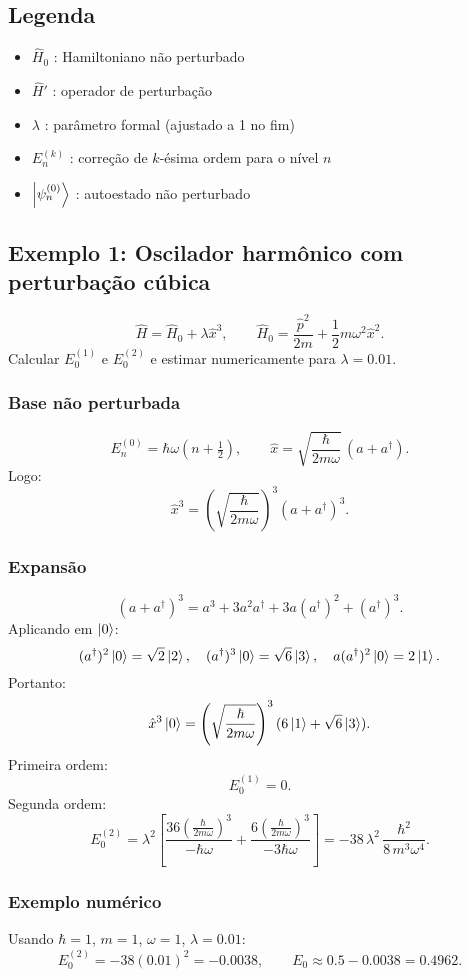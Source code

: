 \documentclass[12pt]{article}
\begin{document}
\subsection{Legenda}
\begin{itemize}
  \item $\hat H_0$ : Hamiltoniano não perturbado
  \item $\hat H'$ : operador de perturbação
  \item $\lambda$ : parâmetro formal (ajustado a 1 no fim)
  \item $E_n^{(k)}$ : correção de $k$-ésima ordem para o nível $n$
  \item $\ket{\psi_n^{(0)}}$ : autoestado não perturbado
\end{itemize}

\subsection{Exemplo 1: Oscilador harmônico com perturbação cúbica}

\[
\hat H = \hat H_0 + \lambda \hat x^3,\qquad
\hat H_0=\frac{\hat p^2}{2m}+\frac{1}{2}m\omega^2\hat x^2.
\]
Calcular $E_0^{(1)}$ e $E_0^{(2)}$ e estimar numericamente para $\lambda=0.01$.

\subsubsection{Base não perturbada}
\[
E_n^{(0)}=\hbar\omega\left(n+\tfrac12\right),\qquad
\hat x = \sqrt{\frac{\hbar}{2m\omega}}\,(a+a^\dagger).
\]
Logo:
\[
\hat x^3 = \left(\sqrt{\frac{\hbar}{2m\omega}}\right)^3 (a+a^\dagger)^3.
\]

\subsubsection{Expansão}
\[
(a+a^\dagger)^3 = a^3 + 3 a^2 a^\dagger + 3 a (a^\dagger)^2 + (a^\dagger)^3.
\]
Aplicando em $\ket{0}$:
\[
(a^\dagger)^2\ket{0}=\sqrt{2}\ket{2},\quad (a^\dagger)^3\ket{0}=\sqrt{6}\ket{3},\quad a(a^\dagger)^2\ket{0}=2\ket{1}.
\]
Portanto:
\[
\hat x^3\ket{0}=\left(\sqrt{\frac{\hbar}{2m\omega}}\right)^3(6\ket{1}+\sqrt{6}\ket{3}).
\]
Primeira ordem:
\[
E_0^{(1)}=0.
\]
Segunda ordem:
\[
E_0^{(2)} = \lambda^2\left[
\frac{36\left(\frac{\hbar}{2m\omega}\right)^3}{-\hbar\omega}+
\frac{6\left(\frac{\hbar}{2m\omega}\right)^3}{-3\hbar\omega}
\right]
= -38\,\lambda^2\,\frac{\hbar^2}{8\,m^3\omega^4}.
\]

\subsubsection{Exemplo numérico}
Usando $\hbar=1$, $m=1$, $\omega=1$, $\lambda=0.01$:
\[
E_0^{(2)}=-38(0.01)^2=-0.0038,\qquad E_0\approx0.5-0.0038=0.4962.
\]
\end{document}

